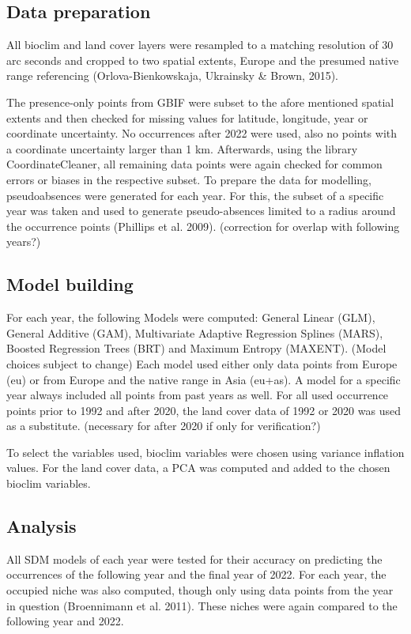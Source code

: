 \documentclass[12pt, english]{article}
\begin{document}
\subsection{Data preparation}
All bioclim and land cover layers were resampled to a matching resolution of 30 arc seconds and cropped to two spatial extents, Europe and the presumed native range referencing (Orlova-Bienkowskaja, Ukrainsky \& Brown, 2015).

The presence-only points from GBIF were subset to the afore mentioned spatial extents and then checked for missing values for latitude, longitude, year or coordinate uncertainty. 
No occurrences after 2022 were used, also no points with a coordinate uncertainty larger than 1 km. 
Afterwards, using the library CoordinateCleaner, all remaining data points were again checked for common errors or biases in the respective subset.
To prepare the data for modelling, pseudoabsences were generated for each year. For this, the subset of a specific year was taken and used to generate pseudo-absences limited to a radius around the occurrence points (Phillips et al. 2009). (correction for overlap with following years?)

\subsection{Model building}
For each year, the following Models were computed: General Linear (GLM), General Additive (GAM), Multivariate Adaptive Regression Splines (MARS), Boosted Regression Trees (BRT) and Maximum Entropy (MAXENT). 
(Model choices subject to change)
Each model used either only data points from Europe (eu) or from Europe and the native range in Asia (eu+as). 
A model for a specific year always included all points from past years as well.
For all used occurrence points prior to 1992 and after 2020, the land cover data of 1992 or 2020 was used as a substitute.
(necessary for after 2020 if only for verification?)

To select the variables used, bioclim variables were chosen using variance inflation values. 
For the land cover data, a PCA was computed and added to the chosen bioclim variables.

\subsection{Analysis}
All SDM models of each year were tested for their accuracy on predicting the occurrences of the following year and the final year of 2022. 
For each year, the occupied niche was also computed, though only using data points from the year in question (Broennimann et al. 2011). 
These niches were again compared to the following year and 2022.
\end{document}
